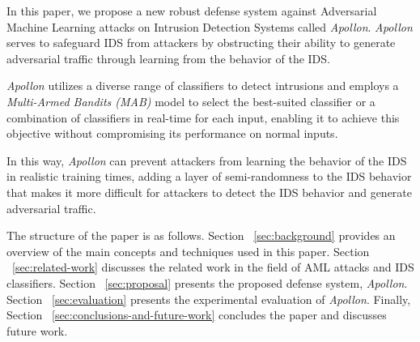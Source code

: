 In this paper, we propose a new robust defense system against Adversarial Machine Learning attacks on Intrusion
Detection Systems called \textit{Apollon}.
\textit{Apollon} serves to safeguard IDS from attackers by obstructing their ability to generate adversarial traffic through
learning from the behavior of the IDS.

\textit{Apollon} utilizes a diverse range of classifiers to detect intrusions and employs a \textit{Multi-Armed Bandits (MAB)}
model to select the best-suited classifier or a combination of classifiers in real-time for each input, enabling it to achieve
this objective without compromising its performance on normal inputs.

In this way, \textit{Apollon} can prevent attackers from learning the behavior of the IDS in realistic training times, adding a
layer of semi-randomness to the IDS behavior that makes it more difficult for attackers to detect the IDS behavior and
generate adversarial traffic.

The structure of the paper is as follows.
Section ~\ref{sec:background} provides an overview of the main concepts and techniques used in this paper.
Section ~\ref{sec:related-work} discusses the related work in the field of AML attacks and IDS classifiers.
Section ~\ref{sec:proposal} presents the proposed defense system, \textit{Apollon}.
Section ~\ref{sec:evaluation} presents the experimental evaluation of \textit{Apollon}.
Finally, Section ~\ref{sec:conclusions-and-future-work} concludes the paper and discusses future work.
